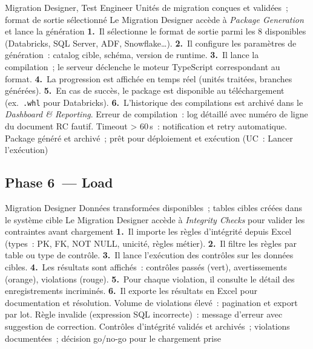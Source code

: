   {Migration Designer, Test Engineer}
  {Unités de migration conçues et validées~; format de sortie sélectionné}
  {Le Migration Designer accède à \textit{Package Generation} et lance la génération}
  {\textbf{1.}~Il sélectionne le format de sortie parmi les 8 disponibles (Databricks, SQL Server, ADF, Snowflake\ldots).\newline
   \textbf{2.}~Il configure les paramètres de génération~: catalog cible, schéma, version de runtime.\newline
   \textbf{3.}~Il lance la compilation~; le serveur déclenche le moteur TypeScript correspondant au format.\newline
   \textbf{4.}~La progression est affichée en temps réel (unités traitées, branches générées).\newline
   \textbf{5.}~En cas de succès, le package est disponible au téléchargement (ex.~\texttt{.whl} pour Databricks).\newline
   \textbf{6.}~L'historique des compilations est archivé dans le \textit{Dashboard \& Reporting}.}
  {Erreur de compilation~: log détaillé avec numéro de ligne du document RC fautif. Timeout > 60\,s~: notification et retry automatique.}
  {Package généré et archivé~; prêt pour déploiement et exécution (UC~: Lancer l'exécution)}

\subsection*{Phase 6~--- Load}

  {Migration Designer}
  {Données transformées disponibles~; tables cibles créées dans le système cible}
  {Le Migration Designer accède à \textit{Integrity Checks} pour valider les contraintes avant chargement}
  {\textbf{1.}~Il importe les règles d'intégrité depuis Excel (types~: PK, FK, NOT NULL, unicité, règles métier).\newline
   \textbf{2.}~Il filtre les règles par table ou type de contrôle.\newline
   \textbf{3.}~Il lance l'exécution des contrôles sur les données cibles.\newline
   \textbf{4.}~Les résultats sont affichés~: contrôles passés (vert), avertissements (orange), violations (rouge).\newline
   \textbf{5.}~Pour chaque violation, il consulte le détail des enregistrements incriminés.\newline
   \textbf{6.}~Il exporte les résultats en Excel pour documentation et résolution.}
  {Volume de violations élevé~: pagination et export par lot. Règle invalide (expression SQL incorrecte)~: message d'erreur avec suggestion de correction.}
  {Contrôles d'intégrité validés et archivés~; violations documentées~; décision go/no-go pour le chargement prise}

